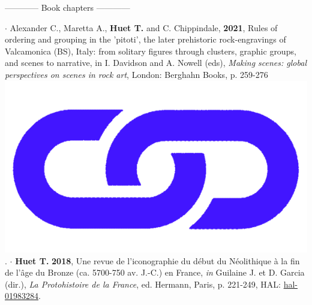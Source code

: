 \documentclass{article}
\begin{document}
\bigbreak
\begin{center}------------ Book chapters ------------\end{center}
\smallbreak
$\cdot$ Alexander C., Maretta A., \textbf{Huet T.} and C. Chippindale, \textbf{2021}, Rules of ordering and grouping in the 'pitoti', the later prehistoric rock-engravings of Valcamonica (BS), Italy: from solitary figures through clusters, graphic groups, and scenes to narrative, in I. Davidson and A. Nowell (eds), \textit{Making scenes: global perspectives on scenes in rock art}, London: Berghahn Books, p. 259-276 \href{https://www.berghahnbooks.com/title/DavidsonMaking}{\includegraphics[scale=0.02]{link_darkblue.png}}.
\smallbreak
$\cdot$ \textbf{Huet T.} \textbf{2018}, Une revue de l'iconographie du d\'{e}but du N\'{e}olithique \`{a} la fin de l'\^{a}ge du Bronze (ca. 5700-750 av. J.-C.) en France, \textit{in} Guilaine J. et D. Garcia (dir.), \textit{La Protohistoire de la France}, ed. Hermann, Paris, p. 221-249, HAL: \href{https://hal.archives-ouvertes.fr/hal-01983284}{hal-01983284}.
\bigbreak
\end{document}
